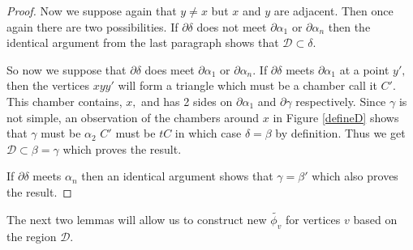 \documentclass[class=book, crop=false,12 pt]{standalone}
\begin{document}
\begin{proof}
Now we suppose again that $y\neq x$ but $x$ and $y$ are adjacent. Then once again there are two possibilities. If $\partial \delta$ does not meet $\partial \alpha_1$ or $\partial \alpha_n$ then the identical argument from the last paragraph shows that $\mathcal{D}\subset \delta.$

So now we suppose that $\partial \delta$ does meet $\partial \alpha_1$ or $\partial \alpha_n.$ If $\partial \delta$ meets $\partial \alpha_1$ at a point $y',$ then the vertices $xyy'$ will form a triangle which must be a chamber call it $C'.$ This chamber contains, $x,$ and has 2 sides on $\partial \alpha_1$ and $\partial \gamma$ respectively. Since $\gamma$ is not simple, an observation of the chambers around $x$ in Figure \ref{defineD} shows that $\gamma$ must be $\alpha_2$ $C'$ must be $tC$ in which case $\delta=\beta$ by definition. Thus we get $\mathcal{D}\subset \beta =\gamma$ which proves the result.

If $\partial \delta$ meets $\alpha_n$ then an identical argument shows that $\gamma=\beta'$ which also proves the result.

\end{proof}

The next two lemmas will allow us to construct new $\tilde{\phi_v}$ for vertices $v$ based on the region $\mathcal{D}.$
\end{document}
